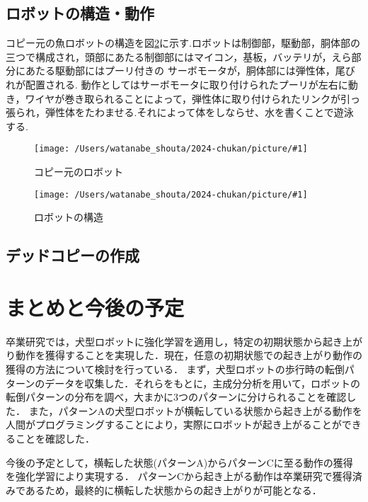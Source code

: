 \documentclass{jarticle}
\newcommand{\setPicture}[1]{\texttt{[image: /Users/watanabe\_shouta/2024-chukan/picture/\#1]}}
\begin{document}
\subsection{ロボットの構造・動作}
コピー元の魚ロボットの構造を図\ref{fig:structure}に示す.ロボットは制御部，駆動部，胴体部の三つで構成され，頭部にあたる制御部にはマイコン，基板，バッテリが，えら部分にあたる駆動部にはプーリ付きの
サーボモータが，胴体部には弾性体，尾びれが配置される.
動作としてはサーボモータに取り付けられたプーリが左右に動き，ワイヤが巻き取られることによって，弾性体に取り付けられたリンクが引っ張られ，弾性体をたわませる.それによって体をしならせ、水を書くことで遊泳する.


\begin{figure}[t]
   \centering
   \setPicture{fish.jpg}
   \vspace*{-4mm}
   \caption{コピー元のロボット}
   \label{fig:fish-type}
\end{figure}

\begin{figure}[t]
   \centering
   \setPicture{tentativeschematic.png}
   \vspace*{-4mm}
   \caption{ロボットの構造}
   \label{fig:structure}
\end{figure}

\subsection{デッドコピーの作成}

\vspace*{-2mm}
\section{まとめと今後の予定}

卒業研究では，犬型ロボットに強化学習を適用し，特定の初期状態から起き上がり動作を獲得することを実現した．現在，任意の初期状態での起き上がり動作の獲得の方法について検討を行っている．
まず，犬型ロボットの歩行時の転倒パターンのデータを収集した．それらをもとに，主成分分析を用いて，ロボットの転倒パターンの分布を調べ，大まかに3つのパターンに分けられることを確認した．
また，パターンAの犬型ロボットが横転している状態から起き上がる動作を人間がプログラミングすることにより，実際にロボットが起き上がることができることを確認した．

今後の予定として，横転した状態(パターンA)からパターンCに至る動作の獲得を強化学習により実現する．
パターンCから起き上がる動作は卒業研究で獲得済みであるため，最終的に横転した状態からの起き上がりが可能となる．
\end{document}
